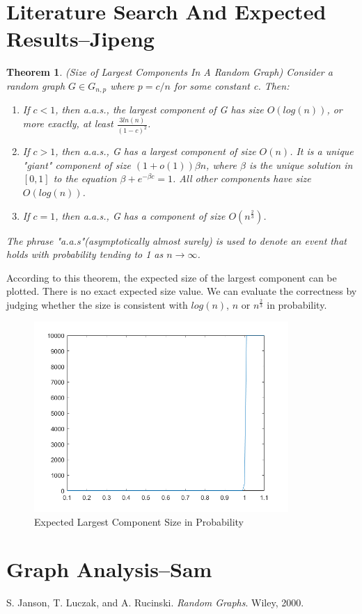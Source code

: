 \documentclass[a4paper,11pt]{article}
\newtheorem{theorem}{Theorem}
\begin{document}
\maketitle
\thispagestyle{empty}


\section{Literature Search And Expected Results--Jipeng}
\begin{theorem}
\emph{(Size of Largest Components In A Random Graph)}
\label{Lagrange}
Consider a random graph $G \in G_{n,p}$ where $p=c/n$ for some constant c. Then:
\begin{enumerate}
\item If $c<1$, then a.a.s., the largest component of G has size $O(log(n))$, or more exactly, at least $\frac{3ln(n)}{(1-c)^2}$. 
\item If $c>1$, then a.a.s., G has a largest component of size $O(n)$. It is a unique "giant" component of size $(1+o(1))\beta n$, where $\beta$ is the unique solution in $[0,1]$ to the equation $\beta+e^{-\beta c}=1$. All other components have size $O(log(n))$.
\item If $c=1$, then a.a.s., G has a component of size $O(n^{\frac{2}{3}})$.
\end{enumerate}
The phrase "a.a.s"(asymptotically almost surely) is used to denote an event that holds with probability tending to 1 as $n \to \infty$.
\end{theorem}

According to this theorem, the expected size of the largest component can be plotted. There is no exact expected size value. We can evaluate the correctness by judging whether the size is consistent with $log(n)$, $n$ or $n^{\frac{2}{3}}$ in probability. 

\begin{figure}[H]
  \includegraphics[width=3.8in]{plot1.png}
  \caption{Expected Largest Component Size in Probability}
\end{figure}


\section{Graph Analysis--Sam}


\begin{thebibliography}{9}
  S. Janson, T. Luczak, and A. Rucinski.
  \textit{Random Graphs}.
  Wiley, 2000.
\end{thebibliography}  
\end{document}
